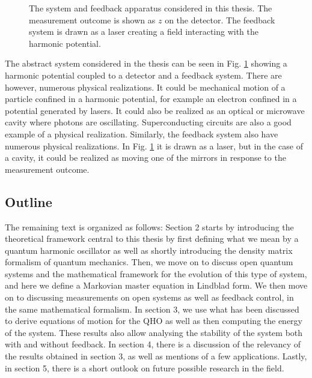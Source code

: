 \begin{figure}
    \centering
    
    \caption{\small The system and feedback apparatus considered in this thesis. The measurement outcome is shown as $z$ on the detector. The feedback system is drawn as a laser creating a field interacting with the harmonic potential.}
    \label{fig:system}
\end{figure}

The abstract system considered in the thesis can be seen in Fig. \ref{fig:system} showing a harmonic potential coupled to a detector and a feedback system. There are however, numerous physical realizations. It could be mechanical motion of a particle confined in a harmonic potential, for example an electron confined in a potential generated by lasers. It could also be realized as an optical or microwave cavity where photons are oscillating. Superconducting circuits are also a good example of a physical realization. Similarly, the feedback system also have numerous physical realizations. In Fig. \ref{fig:system} it is drawn as a laser, but in the case of a cavity, it could be realized as moving one of the mirrors in response to the measurement outcome.


\subsection{Outline}
The remaining text is organized as follows: Section 2 starts by introducing the theoretical framework central to this thesis by first defining what we mean by a quantum harmonic oscillator as well as shortly introducing the density matrix formalism of quantum mechanics. Then, we move on to discuss open quantum systems and the mathematical framework for the evolution of this type of system, and here we define a Markovian master equation in Lindblad form. We then move on to discussing measurements on open systems as well as feedback control, in the same mathematical formalism. In section 3, we use what has been discussed to derive equations of motion for the QHO as well as then computing the energy of the system. These results also allow analysing the stability of the system both with and without feedback. In section 4, there is a discussion of the relevancy of the results obtained in section 3, as well as mentions of a few applications. Lastly, in section 5, there is a short outlook on future possible research in the field.


